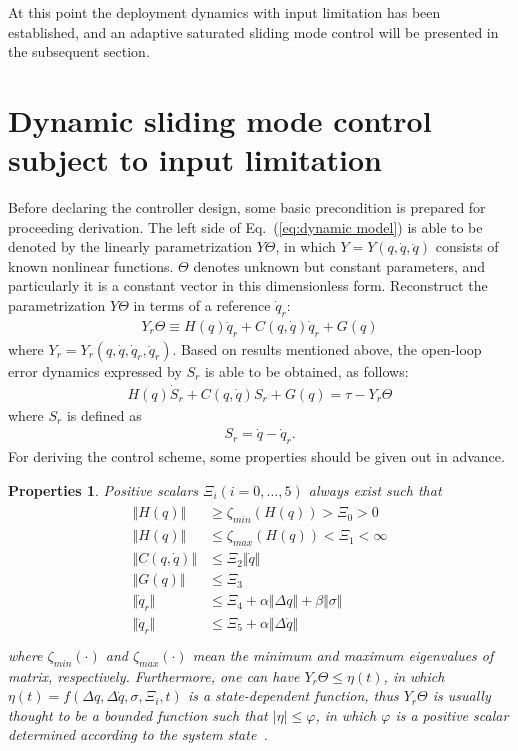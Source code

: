 \documentclass[Journal,letterpaper]{ascelike-new}
\theoremstyle{plain}
\newtheorem{mypro}{Properties}
\theoremstyle{remark}
\begin{document}
At this point the deployment dynamics with input limitation has been established, and an adaptive saturated sliding mode  control will be presented in the subsequent section.
\section{Dynamic sliding mode control subject to input limitation}\label{sec:3}
Before declaring the controller design, some basic precondition is prepared for proceeding derivation.  The left side of Eq.~(\ref{eq:dynamic model}) is able to be denoted by the linearly parametrization $Y\Theta$, in which $Y=Y(q,\dot q,\ddot q)$ consists of known nonlinear functions. $\Theta$ denotes unknown but constant parameters, and particularly it is a constant vector in this dimensionless form. Reconstruct the parametrization $Y\Theta$ in terms of a reference $\dot q_r$:
\begin{align}
 Y_r\Theta\equiv H(q)\ddot q_r+C(q,\dot q)\dot q_r+G(q)\label{eq:dynamic model 1}
\end{align}
where $Y_r = Y_r(q,\dot q,\dot q_r,\ddot q_r)$. Based on results mentioned above, the open-loop error dynamics expressed by $S_r$ is able to be obtained, as follows:
\begin{align}
H(q)\dot S_r+C(q,\dot q)S_r+G(q)=\tau - Y_r\Theta\label{eq:dynamic model 2}
\end{align}
where $S_r$ is defined as
\begin{align}
S_r=\dot q-\dot q_r.\label{eq:Sr1}
\end{align}
For deriving the control scheme, some properties should be given out in advance.
\begin{mypro}
Positive scalars $\Xi_i(i = 0,\ldots,5)$ always exist such that
\begin{align}
\begin{split}
\Vert H(q)\Vert & \ge \zeta_{min}(H(q))>\Xi_0>0\\
\Vert H(q)\Vert & \le \zeta_{max}(H(q))<\Xi_1<\infty\\
\Vert C(q,\dot q)\Vert & \le \Xi_2\Vert\dot q\Vert\\
\Vert G(q)\Vert & \le \Xi_3\\
\Vert \dot q_r\Vert & \le \Xi_4+\alpha\Vert\Delta q\Vert+\beta\Vert\sigma\Vert\\
\Vert \ddot q_r\Vert & \le \Xi_5+\alpha\Vert\Delta \dot q\Vert\\
\end{split}
\end{align}
where $\zeta_{min}(\cdot)$ and $\zeta_{max}(\cdot)$ mean the minimum and maximum eigenvalues of matrix, respectively. Furthermore, one can have $Y_r\Theta\le \eta(t)$, in which $\eta(t)=f(\Delta q,\Delta \dot q,\sigma,\Xi_i,t)$ is a state-dependent function, thus $Y_r\Theta$ is usually thought to be a bounded function such that $\vert\eta\vert\le\varphi$, in which $\varphi$ is a positive scalar determined according to the system state~\cite{parra2003dynamic}.
\end{mypro}
\end{document}

